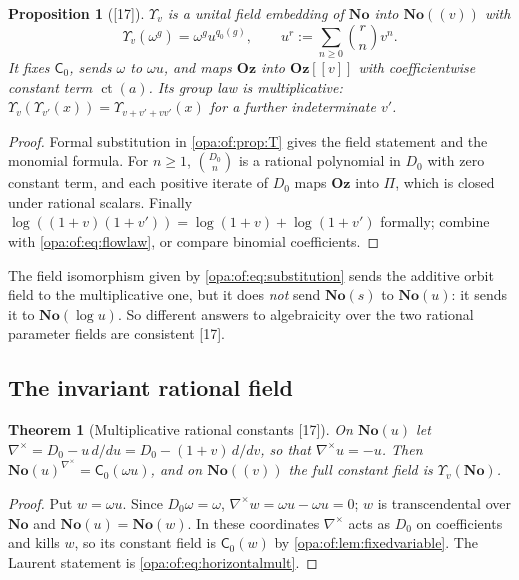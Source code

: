 \documentclass[11pt,oneside]{article}
\numberwithin{equation}{section}
\newtheorem{theorem}{Theorem}[section]
\newtheorem{proposition}[proposition]{Proposition}
\theoremstyle{definition}
\theoremstyle{remark}
\newcommand{\No}{\mathbf{No}}
\newcommand{\Oz}{\mathbf{Oz}}
\newcommand{\ct}{\operatorname{ct}}
\newcommand{\src}[1]{\textup{\textsf{\small[#1]}}}
\begin{document}
\begin{proposition}[\src{17}]\label{opa:of:prop:U}
$\Upsilon_v$ is a unital field embedding of $\No$ into $\No((v))$ with
\begin{equation}\label{opa:of:eq:Umono}
 \Upsilon_v(\omega^g)=\omega^gu^{q_0(g)},\qquad u^r:=\sum_{n\ge0}\binom rnv^n.
\end{equation}
It fixes $\mathsf C_0$, sends $\omega$ to $\omega u$, and maps $\Oz$ into $\Oz[[v]]$ with coefficientwise constant term $\ct(a)$. Its
group law is multiplicative: $\Upsilon_v(\Upsilon_{v'}(x))=\Upsilon_{v+v'+vv'}(x)$ for a further indeterminate $v'$.
\end{proposition}
\begin{proof}
Formal substitution in \cref{opa:of:prop:T} gives the field statement and the monomial formula. For $n\ge1$, $\binom{D_0}n$ is a
rational polynomial in $D_0$ with zero constant term, and each positive iterate of $D_0$ maps $\Oz$ into $\Pi$, which is closed
under rational scalars. Finally $\log((1+v)(1+v'))=\log(1+v)+\log(1+v')$ formally; combine with \eqref{opa:of:eq:flowlaw}, or
compare binomial coefficients.
\end{proof}

The field isomorphism given by \eqref{opa:of:eq:substitution} sends the additive orbit field to the multiplicative one, but it
does \emph{not} send $\No(s)$ to $\No(u)$: it sends it to $\No(\log u)$. So different answers to algebraicity over the two
rational parameter fields are consistent \src{17}.

\subsection{The invariant rational field}

\begin{theorem}[Multiplicative rational constants \src{17}]\label{opa:of:thm:multconst}
On $\No(u)$ let $\nabla^\times=D_0-u\,d/du=D_0-(1+v)\,d/dv$, so that $\nabla^\times u=-u$. Then
$\No(u)^{\nabla^\times}=\mathsf C_0(\omega u)$, and on $\No((v))$ the full constant field is $\Upsilon_v(\No)$.
\end{theorem}
\begin{proof}
Put $w=\omega u$. Since $D_0\omega=\omega$, $\nabla^\times w=\omega u-\omega u=0$; $w$ is transcendental over $\No$ and
$\No(u)=\No(w)$. In these coordinates $\nabla^\times$ acts as $D_0$ on coefficients and kills $w$, so its constant field is
$\mathsf C_0(w)$ by \cref{opa:of:lem:fixedvariable}. The Laurent statement is \eqref{opa:of:eq:horizontalmult}.
\end{proof}
\end{document}
